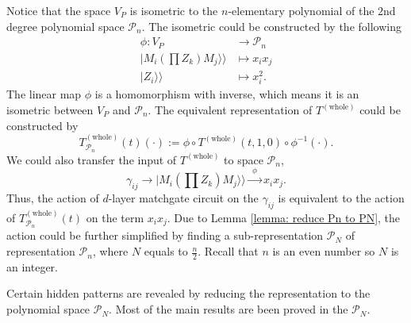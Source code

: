 \documentclass{article}
\newcommand{\Twhole}{T^{(\text{whole})}}
\newcommand{\supket}[1]{|#1 \rangle\rangle}
\begin{document}
Notice that the space $V_P$ is isometric to the $n$-elementary polynomial of the $2$nd degree polynomial space $\mathcal{P}_n$. The isometric could be constructed by the following
\begin{equation}
    \begin{aligned}
        \phi : V_P &\to \mathcal{P}_n \\
        \supket{M_i(\prod Z_k)M_j} &\mapsto x_i x_j \\
        \supket{Z_i} &\mapsto x_i^2.
    \end{aligned}
\end{equation}
The linear map $\phi$ is a homomorphism with inverse, which means it is an isometric between $V_P$ and $\mathcal{P}_n$. The equivalent representation of $\Twhole$ could be constructed by
\begin{equation}
    \Twhole_{\mathcal{P}_n}(t) (\cdot) := \phi \circ \Twhole(t,1,0) \circ \phi^{-1} (\cdot).
\end{equation}
We could also transfer the input of $\Twhole$ to space $\mathcal{P}_n$,
\begin{equation}
    \gamma_{ij} \longrightarrow \supket{M_i(\prod Z_k)M_j} \xrightarrow{~~\phi~~} x_i x_j.
\end{equation}
Thus, the action of $d$-layer matchgate circuit on the $\gamma_{ij}$ is equivalent to the action of $\Twhole_{\mathcal{P}_n}(t)$ on the term $x_i x_j$. 
Due to Lemma \ref{lemma: reduce Pn to PN}, the action could be further simplified by finding a sub-representation $\mathcal{P}_N$ of representation $\mathcal{P}_n$, where $N$ equals to $\frac{n}{2}$. Recall that $n$ is an even number so $N$ is an integer. 

Certain hidden patterns are revealed by reducing the representation to the polynomial space $\mathcal{P}_N$. Most of the main results are been proved in the $\mathcal{P}_N$. 
\end{document}
